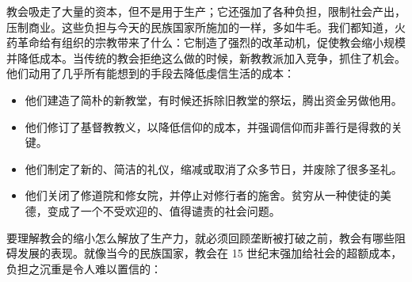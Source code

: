 教会吸走了大量的资本，但不是用于生产；它还强加了各种负担，限制社会产出，压制商业。这些负担与今天的民族国家所施加的一样，多如牛毛。我们都知道，火药革命给有组织的宗教带来了什么：它制造了强烈的改革动机，促使教会缩小规模并降低成本。当传统的教会拒绝这么做的时候，新教教派加入竞争，抓住了机会。他们动用了几乎所有能想到的手段去降低虔信生活的成本：

\begin{itemize}
    \item 他们建造了简朴的新教堂，有时候还拆除旧教堂的祭坛，腾出资金另做他用。
    \item 他们修订了基督教教义，以降低信仰的成本，并强调信仰而非善行是得救的关键。
    \item 他们制定了新的、简洁的礼仪，缩减或取消了众多节日，并废除了很多圣礼。
    \item 他们关闭了修道院和修女院，并停止对修行者的施舍。贫穷从一种使徒的美德，变成了一个不受欢迎的、值得谴责的社会问题。
\end{itemize}

要理解教会的缩小怎么解放了生产力，就必须回顾垄断被打破之前，教会有哪些阻碍发展的表现。就像当今的民族国家，教会在 15 世纪末强加给社会的超额成本，负担之沉重是令人难以置信的：

